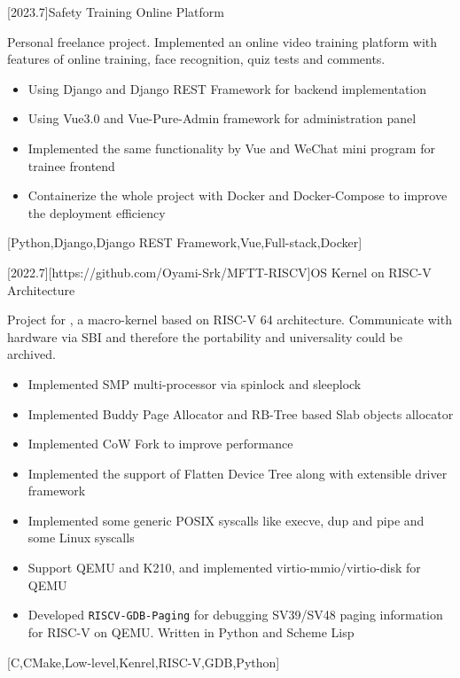 \documentclass[en]{resume}
\begin{document}
\begin {projects}
	[2023.7]{Safety Training Online Platform}{
		Personal freelance project. Implemented an online video training platform with features of online training, face recognition, quiz tests and comments.
		\begin{itemize}
			\item Using Django and Django REST Framework for backend implementation
			\item Using Vue3.0 and Vue-Pure-Admin framework for administration panel
			\item Implemented the same functionality by Vue and WeChat mini program for trainee frontend
			\item Containerize the whole project with Docker and Docker-Compose to improve the deployment efficiency
		\end{itemize}
	}[Python,Django,Django REST Framework,Vue,Full-stack,Docker]

	[2022.7][https://github.com/Oyami-Srk/MFTT-RISCV]{OS Kernel on RISC-V Architecture}{
		Project for , a macro-kernel based on RISC-V 64 architecture. Communicate with hardware via SBI and therefore the portability and universality could be archived.
		\begin{itemize}
			\item Implemented SMP multi-processor via spinlock and sleeplock
			\item Implemented Buddy Page Allocator and RB-Tree based Slab objects allocator
			\item Implemented CoW Fork to improve performance
			\item Implemented the support of Flatten Device Tree along with extensible driver framework
			\item Implemented some generic POSIX syscalls like execve, dup and pipe and some Linux syscalls
			\item Support QEMU and K210, and implemented virtio-mmio/virtio-disk for QEMU
			\item Developed  {\texttt{RISCV-GDB-Paging}} for debugging SV39/SV48 paging information for RISC-V on QEMU. Written in Python and Scheme Lisp
		\end{itemize}
	}[C,CMake,Low-level,Kenrel,RISC-V,GDB,Python]


\end{projects}
\end{document}
